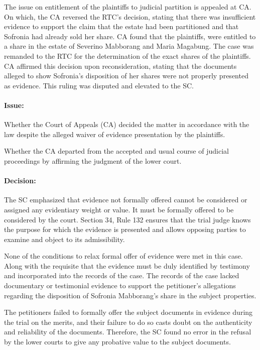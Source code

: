 \documentclass[
12pt,
oneside,
onehalfspacing,
headsepline
]{DigestCollection}
\begin{document}
The issue on entitlement of the plaintiffs to judicial partition is appealed at CA. On which, the CA reversed the RTC's decision, stating that there was insufficient evidence to support the claim that the estate had been partitioned and that Sofronia had already sold her share. CA found that the plaintiffs, were entitled to a share in the estate of Severino Mabborang and Maria Magabung. The case was remanded to the RTC for the determination of the exact shares of the plaintiffs. CA affirmed this decision upon reconsideration, stating that the documents alleged to show Sofronia's disposition of her shares were not properly presented as evidence. This ruling was disputed and elevated to the SC. 

\paragraph{Issue:}
\label{9d632520-1149-11ef-a21b-81e54ec76734}


Whether the Court of Appeals (CA) decided the matter in accordance with the law despite the alleged waiver of evidence presentation by the plaintiffs.

Whether the CA departed from the accepted and usual course of judicial proceedings by affirming the judgment of the lower court.

\paragraph{Decision:}
\label{9b1a94b0-1149-11ef-a21b-81e54ec76734}


The SC emphasized that evidence not formally offered cannot be considered or assigned any evidentiary weight or value. It must be formally offered to be considered by the court. Section 34, Rule 132 ensures that the trial judge knows the purpose for which the evidence is presented and allows opposing parties to examine and object to its admissibility.

None of the conditions to relax formal offer of evidence were met in this case. Along with the requisite that the evidence must be duly identified by testimony and incorporated into the records of the case. The records of the case lacked documentary or testimonial evidence to support the petitioner's allegations regarding the disposition of Sofronia Mabborang's share in the subject properties.

The petitioners failed to formally offer the subject documents in evidence during the trial on the merits, and their failure to do so casts doubt on the authenticity and reliability of the documents. Therefore, the SC found no error in the refusal by the lower courts to give any probative value to the subject documents.
\end{document}
